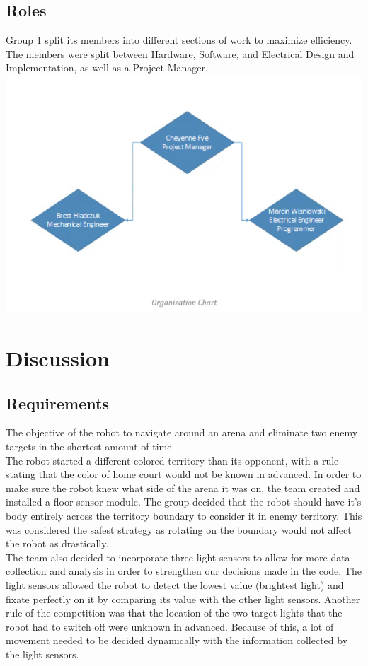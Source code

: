 \documentclass{article}
\begin{document}
\subsection{Roles}
Group 1 split its members into different sections of work to maximize efficiency. The members were split between Hardware, Software, and Electrical Design and Implementation, as well as a Project Manager.
\includegraphics[width=\textwidth]{Organization_Chart.png}

\newpage
\section{Discussion}
\subsection{Requirements}
    The objective of the robot to navigate around an arena and eliminate two enemy targets in the shortest amount of time. \\
    
    The robot started a different colored territory than its opponent, with a rule stating that the color of home court would not be known in advanced. In order to make sure the robot knew what side of the arena it was on, the team created and installed a floor sensor module. The group decided that the robot should have it's body entirely across the territory boundary to consider it in enemy territory. This was considered the safest strategy as rotating on the boundary would not affect the robot as drastically. \\

    The team also decided to incorporate three light sensors to allow for more data collection and analysis in order to strengthen our decisions made in the code. The light sensors allowed the robot to detect the lowest value (brightest light) and fixate perfectly on it by comparing its value with the other light sensors. Another rule of the competition was that the location of the two target lights that the robot had to switch off were unknown in advanced. Because of this, a lot of movement needed to be decided dynamically with the information collected by the light sensors. \\
\end{document}

